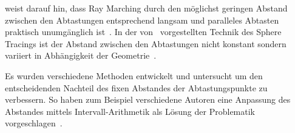 \citeauthor{hart_sphere_1994} weist darauf hin, dass Ray Marching durch
den möglichst geringen Abstand zwischen den Abtastungen entsprechend
langsam und paralleles Abtasten praktisch unumgänglich ist~\parencite[S.
528]{hart_sphere_1994}. In der von~\citeauthor{hart_sphere_1994} vorgestellten
Technik des Sphere Tracings ist der Abstand zwischen den Abtastungen
nicht konstant sondern variiert in Abhängigkeit der
Geometrie~\parencite[S. 538 bis 540]{hart_sphere_1994}.

Es wurden verschiedene Methoden entwickelt und untersucht um den
entscheidenden Nachteil des fixen Abstandes der Abtastungspunkte zu
verbessern. So haben zum Beispiel verschiedene Autoren eine Anpassung
des Abstandes mittels Intervall-Arithmetik als Lösung der Problematik
vorgeschlagen~\parencites{caprani_robust_2000}{mitchell_robust_1990}.
